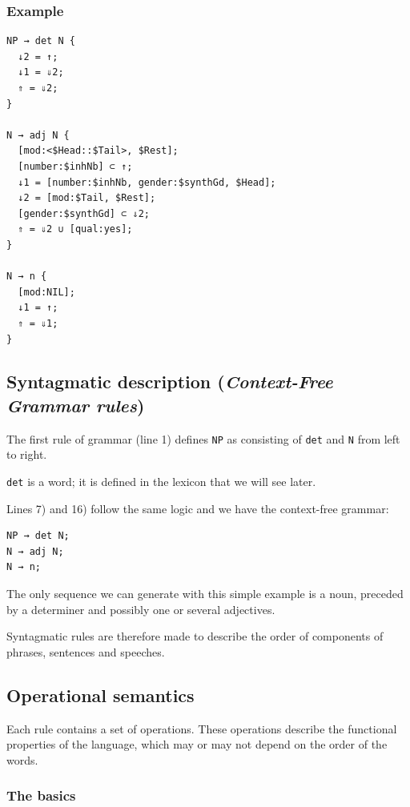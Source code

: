 \documentclass[11pt]{article}
\begin{document}
\subsubsection*{Example}

\begin{lstlisting}
NP → det N {
  ↓2 = ↑;
  ↓1 = ⇓2;
  ⇑ = ⇓2;
}

N → adj N {
  [mod:<$Head::$Tail>, $Rest];
  [number:$inhNb] ⊂ ↑;
  ↓1 = [number:$inhNb, gender:$synthGd, $Head];
  ↓2 = [mod:$Tail, $Rest];
  [gender:$synthGd] ⊂ ⇓2;
  ⇑ = ⇓2 ∪ [qual:yes];
}

N → n {
  [mod:NIL];
  ↓1 = ↑;
  ⇑ = ⇓1;
}
\end{lstlisting}

\subsection{Syntagmatic description (\textit{Context-Free Grammar rules})}

The first rule of grammar (line 1) defines \texttt{NP} as
consisting of \texttt{det} and \texttt{N} from left to right.

\texttt{det} is a word; it is defined in the lexicon that we will see
later.

Lines 7) and 16) follow the same logic and we have the
context-free grammar:

\begin{lstlisting}[numbers=none]
NP → det N;
N → adj N;
N → n;
\end{lstlisting}

The only sequence we can generate with this simple example is
a noun, preceded by a determiner and possibly one or several adjectives.

Syntagmatic rules are therefore made to describe the order of
components of phrases, sentences and speeches.

\subsection{Operational semantics}

Each rule contains a set of operations. These operations describe the
functional properties of the language, which may or may not depend on
the order of the words.

\subsubsection*{The basics}
\end{document}
